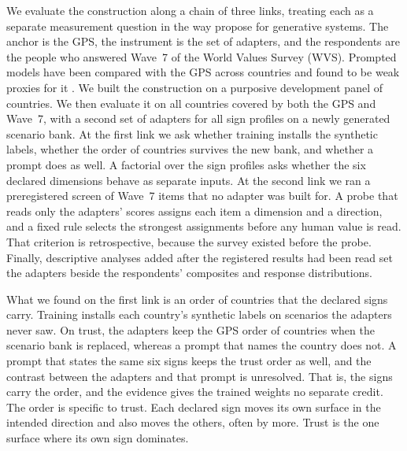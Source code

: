 We evaluate the construction along a chain of three links, treating each as a separate measurement question in the way \citet{wallach2025} propose for generative systems. The anchor is the GPS, the instrument is the set of adapters, and the respondents are the people who answered Wave~7 of the World Values Survey (WVS). Prompted models have been compared with the GPS across countries and found to be weak proxies for it \citep{chen2026}. We built the construction on a purposive development panel of  countries. We then evaluate it on all  countries covered by both the GPS and Wave~7, with a second set of adapters for all  sign profiles on a newly generated scenario bank. At the first link we ask whether training installs the synthetic labels, whether the order of countries survives the new bank, and whether a prompt does as well. A factorial over the  sign profiles asks whether the six declared dimensions behave as separate inputs. At the second link we ran a preregistered screen of  Wave~7 items that no adapter was built for. A probe that reads only the adapters' scores assigns each item a dimension and a direction, and a fixed rule selects the strongest assignments before any human value is read. That criterion is retrospective, because the survey existed before the probe. Finally, descriptive analyses added after the registered results had been read set the adapters beside the respondents' composites and response distributions.

What we found on the first link is an order of countries that the declared signs carry. Training installs each country's synthetic labels on scenarios the adapters never saw. On trust, the adapters keep the GPS order of countries when the scenario bank is replaced, whereas a prompt that names the country does not. A prompt that states the same six signs keeps the trust order as well, and the contrast between the adapters and that prompt is unresolved. That is, the signs carry the order, and the evidence gives the trained weights no separate credit. The order is specific to trust. Each declared sign moves its own surface in the intended direction and also moves the others, often by more. Trust is the one surface where its own sign dominates.

